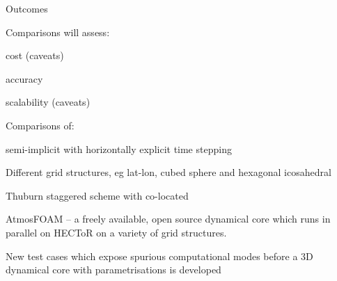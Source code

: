 \begin{slide}{Outcomes}

\begin{list0}

\item Comparisons will assess:
    \begin{list1}
    \item cost (caveats)
    \item accuracy
    \item scalability (caveats)
    \end{list1}

\item Comparisons of:
    \begin{list1}
    \item semi-implicit with horizontally explicit time stepping
    \item Different grid structures, eg lat-lon, cubed sphere and hexagonal icosahedral
    \item Thuburn staggered scheme with co-located
    \end{list1}

\item AtmosFOAM -- a freely available, open source dynamical core which runs in parallel on HECToR on a variety of grid structures.

\item New test cases which expose spurious computational modes before a 3D dynamical core with parametrisations is developed

\end{list0}

\end{slide}
